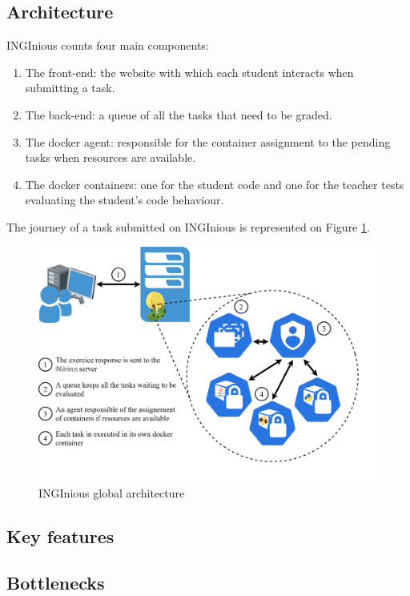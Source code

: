 \subsection{Architecture}
INGInious counts four main components:
\begin{enumerate}
  \item The front-end: the website with which each student interacts when submitting a task.
  \item The back-end: a queue of all the tasks that need to be graded.
  \item The docker agent: responsible for the container assignment to the pending tasks when resources are available.
  \item The docker containers: one for the student code and one for the teacher tests evaluating the student's code behaviour.
\end{enumerate}
The journey of a task submitted on INGInious is represented on Figure \ref{fig:architecture}.
\begin{figure}[!h]
  \begin{center}
    \includegraphics[width=\linewidth]{images/Architecture.png}
    \caption{INGInious global architecture}
    \label{fig:architecture}
  \end{center}
\end{figure}

\subsection{Key features}

\subsection{Bottlenecks}

